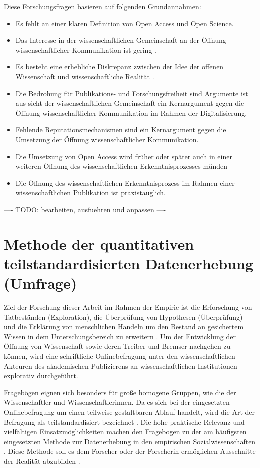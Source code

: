 Diese Forschungsfragen basieren auf folgenden Grundannahmen:
\begin{itemize}
\item Es fehlt an einer klaren Definition von Open Access und Open Science.
\item Das Interesse in der wissenschaftlichen Gemeinschaft an der Öffnung wissenschaftlicher Kommunikation ist gering \cite{hagner_2015_sache_buches}.
\item Es besteht eine erhebliche Diskrepanz zwischen der Idee der offenen Wissenschaft und wissenschaftliche Realität \cite{Scheliga_2014}.
\item Die Bedrohung für Publikations- und Forschungsfreiheit sind Argumente ist aus sicht der wissenschaftlichen Gemeinschaft ein Kernargument gegen die Öffnung wissenschaftlicher Kommunikation im Rahmen der Digitalisierung.
\item Fehlende Reputationsmechanismen sind ein Kernargument gegen die Umsetzung der Öffnung wissenschaftlicher Kommunikation.
\item Die Umsetzung von Open Access wird früher oder später auch in einer weiteren Öffnung des wissenschaftlichen Erkenntnisprozesses münden
\item Die Öffnung des wissenschaftlichen Erkenntnisprozess im Rahmen einer wissenschaftlichen Publikation ist praxistauglich.
\end{itemize}

---- TODO: bearbeiten, ausfuehren und anpassen ----


\section{Methode der quantitativen teilstandardisierten Datenerhebung (Umfrage)}

Ziel der Forschung dieser Arbeit im Rahmen der Empirie ist die Erforschung von Tatbeständen (Exploration), die Überprüfung von Hypothesen (Überprüfung) \cite{raab_2012_fragebogen} und die Erklärung von menschlichen Handeln \cite{suchen_Methoden_d_empirischen_Sozialforschung} um den Bestand an gesichertem Wissen in dem Unterschungsbereich zu erweitern \cite{bortz_Döring_2006_fragestellung}. Um der Entwicklung der Öffnung von Wissenschaft sowie deren Treiber und Bremser nachgehen zu können, wird eine schriftliche Onlinebefragung unter den wissenschaftlichen Akteuren des akademischen Publizierens an wissenschaftlichen Institutionen explorativ durchgeführt.

Fragebögen eignen sich besonders für große homogene Gruppen, wie die der Wissenschaftler und Wissenschaftlerinnen. Da es sich bei der eingesetzten Onlinebefragung um einen teilweise gestaltbaren Ablauf handelt, wird die Art der Befragung als teilstandardisiert bezeichnet \cite{raab_2012_fragebogen}. Die hohe praktische Relevanz und vielfältigen Einsatzmöglichkeiten machen den Fragebogen zu der am häufigsten eingesetzten Methode zur Datenerhebung in den empirischen Sozialwissenschaften \cite{raab_2012_fragebogen}. Diese Methode soll es dem Forscher oder der Forscherin ermöglichen Ausschnitte der Realität abzubilden \cite{raab_2012_fragebogen}.

